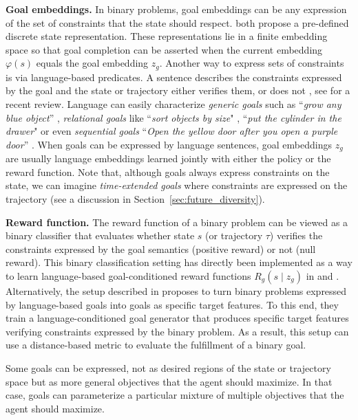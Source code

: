 \textbf{Goal embeddings.} In binary problems, goal embeddings can be any expression of the set of constraints
that the state should respect. \cite{akakzia2020decstr,ecoffet2020first} both propose a pre-defined discrete state representation. These representations lie in a finite embedding space so that goal completion can be asserted when the current embedding $\varphi(s)$ equals the goal embedding $z_g$. Another way to express sets of constraints is via language-based predicates. A sentence describes the constraints expressed by the goal and the state or trajectory
either verifies them, or does not \cite{Hermann2017,chan2019actrce,Jiang2019,bahdanau2018learning,bahdanau2018systematic,hill2019emergent,ther,imagine,lynch2020grounding}, see \cite{Luketina2019} for a recent review. Language can easily characterize \textit{generic goals} such as ``\textit{grow any blue object}'' \cite{imagine}, \textit{relational goals} like ``\textit{sort objects by size}" \cite{Jiang2019}, ``\textit{put the cylinder in the drawer}" \cite{lynch2020grounding} or even \textit{sequential goals} ``\textit{Open the yellow door after you open a purple door}'' \cite{chevalier-boisvert2018babyai}. When goals can be expressed by language sentences, goal embeddings $z_g$ are usually language embeddings learned jointly with either the policy or the reward function. Note that, although \rl goals always express constraints on the state, we can imagine \textit{time-extended goals} where constraints are expressed on the trajectory (see a discussion in Section~\ref{sec:future_diversity}).

\textbf{Reward function.} The reward function of a binary problem can be viewed as a binary classifier that evaluates whether state $s$ (or trajectory $\tau$) verifies the constraints expressed by the goal semantics (positive reward) or not (null reward). This binary classification setting has directly been implemented as a way to learn language-based goal-conditioned reward functions $R_g(s\mid z_g)$ in \cite{bahdanau2018learning} and \cite{imagine}. Alternatively, the setup described in \cite{colas2020language} proposes to turn binary problems expressed by language-based goals into goals as specific target features. To this end, they train a language-conditioned goal generator that produces specific target features verifying constraints expressed by the binary problem. As a result, this setup can use a distance-based metric to evaluate the fulfillment of a binary goal.

Some goals can be expressed, not as desired regions of the state or trajectory space but as more general objectives that the agent should maximize. In that case, goals can parameterize a particular mixture of multiple objectives that the agent should maximize.

